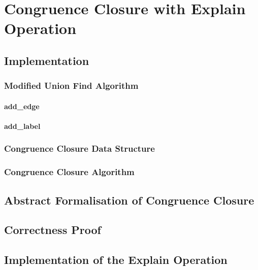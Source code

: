
\chapter{Congruence Closure with Explain Operation}\label{chapter:congruence_closure}

\section{Implementation}

\subsection{Modified Union Find Algorithm}

\subsubsection{add\_edge}

\subsubsection{add\_label}

\subsection{Congruence Closure Data Structure}

\subsection{Congruence Closure Algorithm}

\section{Abstract Formalisation of Congruence Closure}

\section{Correctness Proof}

\section{Implementation of the Explain Operation}
